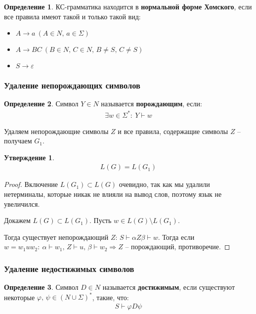 \documentclass[a4paper,12pt]{article}
\renewcommand{\phi}{\ensuremath{\varphi}}
\theoremstyle{plain}
\newtheorem{proposition}{Утверждение}[subsection]
\theoremstyle{definition}
\newtheorem{definition}{Определение}[subsection]
\theoremstyle{remark}
\begin{document}
\begin{definition}
	КС-грамматика находится в \textbf{нормальной форме Хомского}, если все правила имеют такой и только такой вид:
	\begin{itemize}
		\item $A \to a \: (A \in N,\, a \in \Sigma)$
		\item $A \to BC \: (B \in N,\, C \in N,\, B \neq S,\, C \neq S)$
		\item $S \to \varepsilon$
	\end{itemize}
\end{definition}

\subsubsection*{Удаление непорождающих символов}
\begin{definition}
	Символ $Y \in N$ называется \textbf{порождающим}, если:
	\begin{align*}{
			\exists} w \in \Sigma^* :\: Y \vdash w
	\end{align*}
\end{definition}

Удаляем непорождающие символы $Z$ и все правила, содержащие символы $Z$ -- получаем $G_1$.

\begin{proposition}
	\begin{align*}
		L(G) = L(G_1)
	\end{align*}
\end{proposition}

\begin{proof}
	Включение $L(G_1) \subset L(G)$ очевидно, так как мы удалили нетерминалы, которые никак не влияли на вывод слов, поэтому язык не увеличился.

	Докажем $L(G) \subset L(G_1)$. Пусть $w \in L(G) \setminus L(G_1)$.

	Тогда существует непорождающий $Z$: $S \vdash \alpha Z \beta \vdash w$. Тогда если $w = w_1uw_2:\: \alpha \vdash w_1,\, Z \vdash u,\, \beta \vdash w_2 \Rightarrow Z$ -- порождающий, противоречие.
\end{proof}

\subsubsection*{Удаление недостижимых символов}
\begin{definition}
	Символ $D \in N$ называется \textbf{достижимым}, если существуют некоторые $\phi,\, \psi \in (N \cup \Sigma)^*$, такие, что:
	\begin{align*}
		S \vdash \phi D \psi
	\end{align*}
\end{definition}
\end{document}
